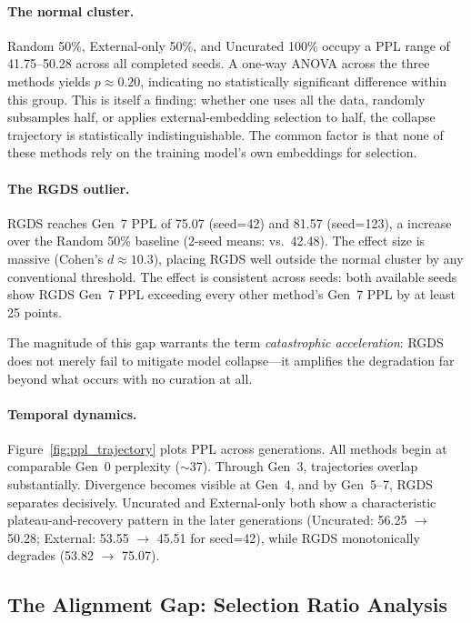 \paragraph{The normal cluster.} Random 50\%, External-only 50\%, and Uncurated 100\% occupy a PPL range of 41.75--50.28 across all completed seeds. A one-way ANOVA across the three methods yields $p \approx 0.20$, indicating no statistically significant difference within this group. This is itself a finding: whether one uses all the data, randomly subsamples half, or applies external-embedding selection to half, the collapse trajectory is statistically indistinguishable. The common factor is that none of these methods rely on the training model's own embeddings for selection.

\paragraph{The RGDS outlier.} RGDS reaches Gen~7 PPL of 75.07 (seed=42) and 81.57 (seed=123), a  increase over the Random 50\% baseline (2-seed means:  vs.\ 42.48). The effect size is massive (Cohen's $d \approx 10.3$), placing RGDS well outside the normal cluster by any conventional threshold. The effect is consistent across seeds: both available seeds show RGDS Gen~7 PPL exceeding every other method's Gen~7 PPL by at least 25 points.

The magnitude of this gap warrants the term \textit{catastrophic acceleration}: RGDS does not merely fail to mitigate model collapse---it amplifies the degradation far beyond what occurs with no curation at all.

\paragraph{Temporal dynamics.} Figure~\ref{fig:ppl_trajectory} plots PPL across generations. All methods begin at comparable Gen~0 perplexity ($\sim$37). Through Gen~3, trajectories overlap substantially. Divergence becomes visible at Gen~4, and by Gen~5--7, RGDS separates decisively. Uncurated and External-only both show a characteristic plateau-and-recovery pattern in the later generations (Uncurated: 56.25 $\rightarrow$ 50.28; External: 53.55 $\rightarrow$ 45.51 for seed=42), while RGDS monotonically degrades (53.82 $\rightarrow$ 75.07).

\subsection{The Alignment Gap: Selection Ratio Analysis}
\label{sec:alignment_gap}


